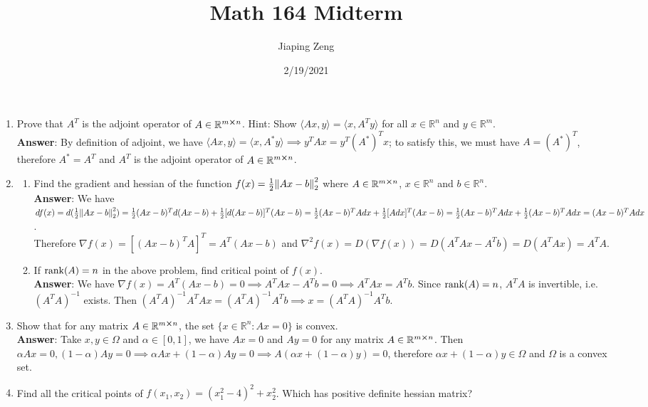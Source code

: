 \documentclass{article}
\title{Math 164 Midterm}
\date{2/19/2021}
\author{Jiaping Zeng}
\begin{document}

\begin{enumerate}
    \item Prove that $A^T$ is the adjoint operator of $A\in\mathbb{R}^{m\cross n}$. Hint: Show $\langle Ax,y\rangle=\langle x,A^Ty\rangle$ for all $x\in\mathbb{R}^n$ and $y\in\mathbb{R}^m$.\\
          \textbf{Answer}: By definition of adjoint, we have $\langle Ax,y\rangle=\langle x,A^*y\rangle\implies y^TAx=y^T(A^*)^Tx$; to satisfy this, we must have $A=(A^*)^T$, therefore $A^*=A^T$ and $A^T$ is the adjoint operator of $A\in\mathbb{R}^{m\cross n}$.
          \newpage
    \item \begin{enumerate}
              \item Find the gradient and hessian of the function $f(x)=\frac{1}{2}\norm{Ax-b}_2^2$ where $A\in\mathbb{R}^{m\cross n}$, $x\in\mathbb{R}^n$ and $b\in\mathbb{R}^n$.\\
                    \textbf{Answer}: We have $df(x)=d(\frac{1}{2}\norm{Ax-b}_2^2)=\frac{1}{2}(Ax-b)^Td(Ax-b)+\frac{1}{2}[d(Ax-b)]^T(Ax-b)=\frac{1}{2}(Ax-b)^TAdx+\frac{1}{2}[Adx]^T(Ax-b)=\frac{1}{2}(Ax-b)^TAdx+\frac{1}{2}(Ax-b)^TAdx=(Ax-b)^TAdx$.\\Therefore $\nabla f(x)=[(Ax-b)^TA]^T=A^T(Ax-b)$ and $\nabla^2 f(x)=D(\nabla f(x))=D(A^TAx-A^Tb)=D(A^TAx)=A^TA$.
              \item If $\rank(A)=n$ in the above problem, find critical point of $f(x)$.\\
                    \textbf{Answer}: We have $\nabla f(x)=A^T(Ax-b)=0\implies A^TAx-A^Tb=0\implies A^TAx=A^Tb$. Since $\rank(A)=n$, $A^TA$ is invertible, i.e. $(A^TA)^{-1}$ exists. Then $(A^TA)^{-1}A^TAx=(A^TA)^{-1}A^Tb\implies x=(A^TA)^{-1}A^Tb$.
          \end{enumerate}
          \newpage
    \item Show that for any matrix $A\in\mathbb{R}^{m\cross n}$, the set $\{x\in\mathbb{R}^n:Ax=0\}$ is convex.\\
          \textbf{Answer}: Take $x,y\in\Omega$ and $\alpha\in[0,1]$, we have $Ax=0$ and $Ay=0$ for any matrix $A\in\mathbb{R}^{m\cross n}$. Then $\alpha Ax=0,(1-\alpha)Ay=0\implies\alpha Ax+(1-\alpha)Ay=0\implies A(\alpha x+(1-\alpha)y)=0$, therefore $\alpha x+(1-\alpha)y\in\Omega$ and $\Omega$ is a convex set.
          \newpage
    \item Find all the critical points of $f(x_1,x_2)=(x_1^2-4)^2+x_2^2$. Which has positive definite hessian matrix?\\

\end{enumerate}
\end{document}
